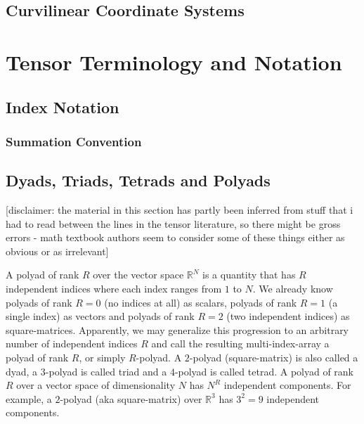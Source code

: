 


\subsection{Curvilinear Coordinate Systems}


\section{Tensor Terminology and Notation}

\subsection{Index Notation}

\subsubsection{Summation Convention}



\subsection{Dyads, Triads, Tetrads and Polyads}

\footnotesize
[disclaimer: the material in this section has partly been inferred from stuff that i had to read between the lines in the tensor literature, so there might be gross errors - math textbook authors seem to consider some of these things either as obvious or as irrelevant]
\normalsize
\newline
\newline

A polyad of rank $R$ over the vector space $\mathbb{R}^N$ is a quantity that has $R$ independent indices where each index ranges from $1$ to $N$. We already know polyads of rank $R=0$ (no indices at all) as scalars, polyads of rank $R=1$ (a single index) as vectors and polyads of rank $R=2$ (two independent indices) as square-matrices. Apparently, we may generalize this progression to an arbitrary number of independent indices $R$ and call the resulting multi-index-array a polyad of rank $R$, or simply $R$-polyad. A $2$-polyad (square-matrix) is also called a dyad, a $3$-polyad is called triad and a $4$-polyad is called tetrad. A polyad of rank $R$ over a vector space of dimensionality $N$ has $N^R$ independent components. For example, a $2$-polyad (aka square-matrix) over $\mathbb{R}^3$ has $3^2 = 9$ independent components. 

